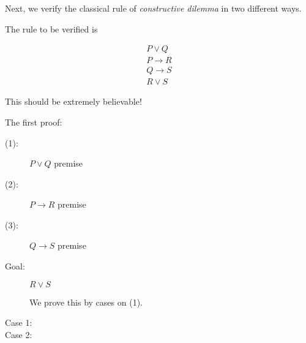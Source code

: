 \documentclass[12pt]{article}
\begin{document}
Next, we verify the classical rule of {\em constructive dilemma\/} in two different ways.

The rule to be verified is

$$\begin{array}{c}

P \vee Q \\

P \rightarrow R \\

Q \rightarrow S \\ \hline 

R \vee S

\end{array}$$

This should be extremely believable!

\newpage

The first proof:

\begin{description}

\item[(1):]  $P \vee Q$  premise

\item[(2):]  $P \rightarrow R$ premise

\item[(3):]  $Q \rightarrow S$  premise

\item[Goal:]  $R \vee S$

We prove this by cases on (1).

\item[Case 1:]



\item[Case 2:]


\end{description}
\end{document}
